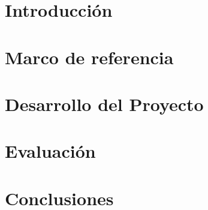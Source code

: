 \documentclass[11pt,twoside]{thesis}
\begin{document}
\maketitle

\makecoverletter


\newpage{\ } 





  
\newpage{\ } 
\thispagestyle{empty} 
\tableofcontents 
\listoffigures   \listoftables   \mainmatter

\dominitoc
\cleardoublepage

\chapter{Introducción}


\chapter{Marco de referencia}
\label{cap:marco}


\chapter{Desarrollo del Proyecto}
\label{cap:desarrollo}



\chapter{Evaluación}
\label{cap:evaluacion}


\chapter{Conclusiones}

\end{document}
